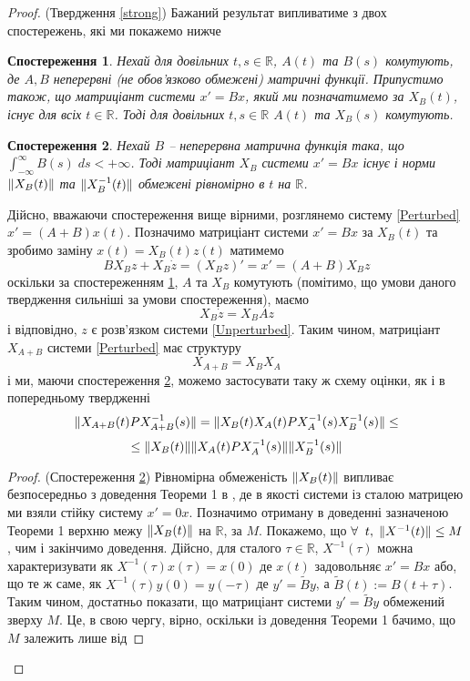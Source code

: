 \documentclass[14pt]{extarticle} %
\let\oldforall\forall
\renewcommand{\forall}{\oldforall\;}
\newtheorem{observation}{Спостереження}
\theoremstyle{remark}
\begin{document}
\begin{proof}{(Твердження \ref{strong})}
	Бажаний результат випливатиме з двох спостережень, які ми покажемо нижче
	\begin{observation}\label{Hard}Нехай для довільних $t,s\in\mathbb{R}$, $A(t)$ та $B(s)$ комутують, де $A,B$ неперервні
	(не обов’язково обмежені) матричні функції. Припустимо також, що матриціант системи $x'=Bx$, який ми позначатимемо за
	$X_B(t)$, існує для всіх $t\in\mathbb{R}$. Тоді для довільних $t,s\in\mathbb{R}$ $A(t)$ та $X_B(s)$ комутують.\end{observation}
	\begin{observation}\label{Easy}Нехай $B$ -- неперервна матрична функція така, що $\int_{-\infty}^\infty B(s)\;ds<+\infty$. Тоді матриціант
		$X_B$ системи $x'=Bx$ існує і норми $\|X_B(t)\|$ та $\|X^{-1}_B(t)\|$ обмежені рівномірно в $t$ на $\mathbb{R}$.
	\end{observation}
	Дійсно, вважаючи спостереження вище вірними, розглянемо систему \ref{Perturbed} $x'=(A+B)x(t)$. Позначимо матриціант системи $x'=Bx$
	за $X_B(t)$ та зробимо заміну $x(t)=X_B(t)z(t)$ матимемо
	\[BX_Bz+X_B\dot{z}=(X_Bz)'=x'=(A+B)X_Bz\]
	оскільки за спостереженням \ref{Hard}, $A$ та $X_B$ комутують (помітимо, що умови даного твердження сильніші за умови спостереження), маємо
	\[X_B\dot{z}=X_BAz\]
	і відповідно, $z$ є розв’язком системи \ref{Unperturbed}. Таким чином, матриціант $X_{A+B}$ системи \ref{Perturbed}
	має структуру
	\[X_{A+B}=X_BX_A\]
	і ми, маючи спостереження \ref{Easy}, можемо застосувати таку ж схему оцінки, як і в попередньому твердженні
	\[\|X_{A+B}(t)PX^{-1}_{A+B}(s)\|=\|X_B(t)X_A(t)PX^{-1}_A(s)X^{-1}_B(s)\|\leq\]
	\[\leq\|X_B(t)\|\|X_A(t)PX^{-1}_A(s)\|\|X_B^{-1}(s)\|\]
	\begin{proof}{(Спостереження \ref{Easy})} Рівномірна обмеженість $\|X_B(t)\|$
	випливає безпосередньо з доведення Теореми 1 в \cite[\S 12]{demidovich}, де в 
	якості системи із сталою матрицею ми взяли стійку систему $x'=0x$. Позначимо отриману в доведенні зазначеною Теореми 1 верхню межу
	$\|X_B(t)\|$ на $\mathbb{R}$, за
	$M$. Покажемо, що $\forall t,\;\mynorm{X^{-1}(t)}\leq M$, чим і закінчимо доведення. Дійсно, для сталого $\tau\in\mathbb{R}$,
	$X^{-1}(\tau)$ можна характеризувати як $X^{-1}(\tau)x(\tau)=x(0)$ де $x(t)$ задовольняє $x'=Bx$ або, що те ж саме, як
	$X^{-1}(\tau)y(0)=y(-\tau)$ де $y'=\tilde{B}y$, а $\tilde{B}(t):=B(t+\tau)$. Таким чином, достатньо показати, що матриціант системи
	$y'=\tilde{B}y$ обмежений зверху $M$. Це, в свою чергу, вірно, оскільки із доведення Теореми 1 бачимо, що $M$ залежить лише від

\end{proof}
\end{proof}
\end{document}
